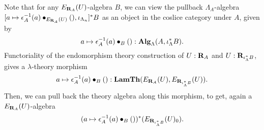 \begin{remark}\label{rem:endomorphism-theory-algebra-to-endomorphism-theory-algebra}
  Note that for any $ E_{\mathbf{R}_A}(U) $-algebra $ B $, we can view the pullback $ \Lambda_A $-algebra $ [a \mapsto \epsilon_A^{-1}(a) \bullet_{E_{\mathbf{R}_A}(U)} (), \iota_{\Lambda_n}]^* B $ as an object in the coslice category under $ A $, given by
  \[ a \mapsto \epsilon_A^{-1}(a) \bullet_B () : \mathbf{Alg}_{\Lambda}(A, \iota_\Lambda^* B). \]
  Functoriality of the endomorphism theory construction of $ U : \mathbf{R}_A $ and $ U : \mathbf{R}_{\iota_\Lambda^* B} $, gives a $ \lambda $-theory morphism
  \[ a \mapsto \epsilon_A^{-1}(a) \bullet_B (): \mathbf{LamTh}(E_{\mathbf{R}_A}(U), E_{\mathbf{R}_{\iota_\Lambda^* B}}(U)). \]
  Then, we can pull back the theory algebra along this morphism, to get, again a $ E_{\mathbf{R}_A}(U) $-algebra
  \[ (a \mapsto \epsilon_A^{-1}(a) \bullet_B ())^* (E_{\mathbf{R}_{\iota_\Lambda^* B}}(U)_0). \]
\end{remark}

